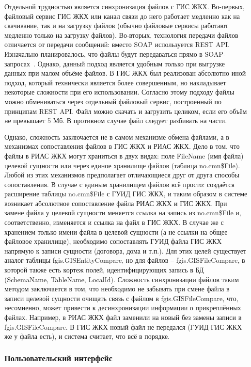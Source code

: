 Отдельной трудностью является синхронизация файлов с ГИС ЖКХ.
Во-первых, файловый сервис ГИС ЖКХ или канал связи до него работает медленно как на скачивание, так и на загрузку файлов (обычно файловые сервисы работают медленно только на загрузку файлов).
Во-вторых, технология передачи файлов отличается от передачи сообщений: вместо SOAP используется REST API.
Изначально планировалось, что файлы будут передаваться прямо в SOAP-запросах~\cite{gis_doc_tff}.
Однако, данный подход является удобным только при выгрузке данных при малом объёме файлов.
В ГИС ЖКХ был реализован абсолютно иной подход, который технически является более совершенным, но накладывает некоторые сложности при его использовании.
Согласно этому подходу файлы можно обмениваться через отдельный файловый сервис, построенный по принципам REST API.
Файл можно скачать и загрузить целиком, если его объём не превышает 5 Мб.
В противном случае файл следует разбивать на части.

Однако, сложность заключается не в самом механизме обмена файлами, а в механизмах сопоставления файлов в ГИС ЖКХ и РИАС ЖКХ.
Дело в том, что файлы в РИАС ЖКХ могут храниться в двух видах: поле FileName (имя файла) целевой сущности или через единое хранилище файлов (таблица no.cmn\$File).
Любой из этих механизмов предполагает отличающиеся друг от друга способы сопоставления.
В случае с единым хранилищем файлов всё просто: создаётся расширение таблицы no.cmn\$File с ГУИД ГИС ЖКХ, и таким образом в системе возникает абсолютное сопоставление файла РИАС ЖКХ и ГИС ЖКХ.
При замене файла у целевой сущности меняется ссылка на запись из no.cmn\$File и, соответственно, изменяется и ссылка на файл в ГИС ЖКХ.
В случае же с хранением только имени файла в целевой сущности (а не ссылки на общее файловое хранилище), необходимо сопоставлять ГУИД файла ГИС ЖКХ напрямую к записи сущности (договора, дома и т.п.).
Для этих целей существует аналог таблицы fgis.GISEntityCompare, но для файлов -- fgis.GISFileCompare, в которой также есть кортеж полей, идентифицирующих запись в БД (SchemaName, TableName, LocalId).
Сложность синхронизации файлов таким методом заключается в том, что необходимо не забывать при смене файла в записи целевой сущности очищать связь с файлом в fgis.GISFileCompare, что, несомненно, может привести к десинхронизации информации о прикреплённых файлах.
Например, в РИАС ЖКХ файл заменили на новый без замены записи в fgis.GISFileCompare.
В ГИС ЖКХ новый файл не передался (ГУИД ГИС ЖКХ же у файла есть), и система считает, что всё в порядке.

\subsubsection{Пользовательский интерфейс}

